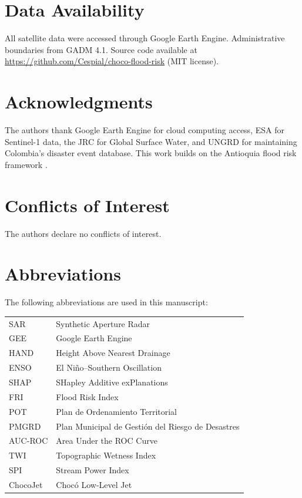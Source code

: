 \documentclass{article}
\begin{document}
\section*{Data Availability}

All satellite data were accessed through Google Earth Engine. Administrative boundaries from GADM 4.1. Source code available at \url{https://github.com/Cespial/choco-flood-risk} (MIT license).

\section*{Acknowledgments}

The authors thank Google Earth Engine for cloud computing access, ESA for Sentinel-1 data, the JRC for Global Surface Water, and UNGRD for maintaining Colombia's disaster event database. This work builds on the Antioquia flood risk framework \citep{EspinalMaya2026}.

\section*{Conflicts of Interest}

The authors declare no conflicts of interest.

\section*{Abbreviations}

The following abbreviations are used in this manuscript:\\

\noindent
\begin{tabular}{@{}ll}
SAR & Synthetic Aperture Radar\\
GEE & Google Earth Engine\\
HAND & Height Above Nearest Drainage\\
ENSO & El Ni\~no--Southern Oscillation\\
SHAP & SHapley Additive exPlanations\\
FRI & Flood Risk Index\\
POT & Plan de Ordenamiento Territorial\\
PMGRD & Plan Municipal de Gesti\'on del Riesgo de Desastres\\
AUC-ROC & Area Under the ROC Curve\\
TWI & Topographic Wetness Index\\
SPI & Stream Power Index\\
ChocoJet & Choc\'o Low-Level Jet
\end{tabular}




\end{document}
